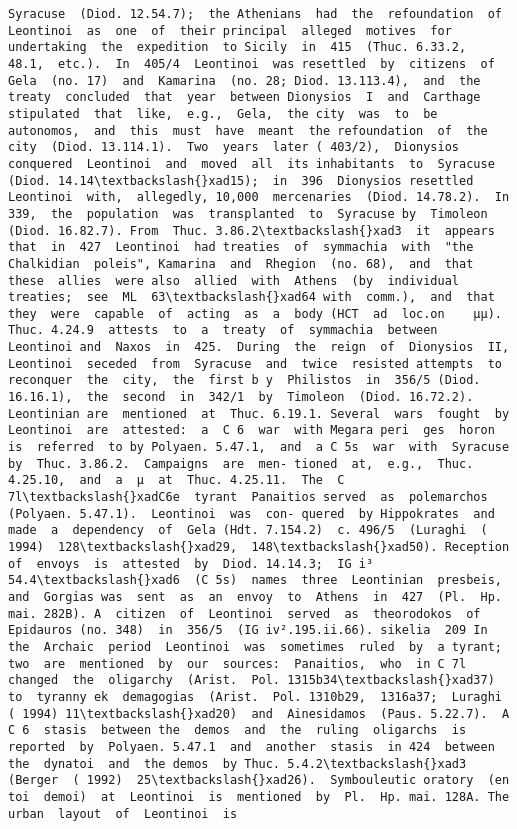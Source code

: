 \documentclass[11pt]{article}
\begin{document}
\begin{Verbatim}[commandchars=\\\{\}]
Syracuse  (Diod. 12.54.7);  the Athenians  had  the  refoundation  of  Leontinoi  as  one  of  their principal  alleged  motives  for  undertaking  the  expedition  to Sicily  in  415  (Thuc. 6.33.2,  48.1,  etc.).  In  405/4  Leontinoi  was resettled  by  citizens  of  Gela  (no. 17)  and  Kamarina  (no. 28; Diod. 13.113.4),  and  the  treaty  concluded  that  year  between Dionysios  I  and  Carthage  stipulated  that  like,  e.g.,  Gela,  the city  was  to  be  autonomos,  and  this  must  have  meant  the refoundation  of  the  city  (Diod. 13.114.1).  Two  years  later ( 403/2),  Dionysios  conquered  Leontinoi  and  moved  all  its inhabitants  to  Syracuse  (Diod. 14.14\textbackslash{}xad15);  in  396  Dionysios resettled  Leontinoi  with,  allegedly, 10,000  mercenaries  (Diod. 14.78.2).  In  339,  the  population  was  transplanted  to  Syracuse by  Timoleon  (Diod. 16.82.7). From  Thuc. 3.86.2\textbackslash{}xad3  it  appears  that  in  427  Leontinoi  had treaties  of  symmachia  with  "the  Chalkidian  poleis", Kamarina  and  Rhegion  (no. 68),  and  that  these  allies  were also  allied  with  Athens  (by  individual  treaties;  see  ML  63\textbackslash{}xad64 with  comm.),  and  that  they  were  capable  of  acting  as  a  body (HCT  ad  loc.on    µµ).  Thuc. 4.24.9  attests  to  a  treaty  of  symmachia  between  Leontinoi and  Naxos  in  425.  During  the  reign  of  Dionysios  II, Leontinoi  seceded  from  Syracuse  and  twice  resisted attempts  to  reconquer  the  city,  the  first b y  Philistos  in  356/5 (Diod. 16.16.1),  the  second  in  342/1  by  Timoleon  (Diod. 16.72.2). Leontinian are  mentioned  at  Thuc. 6.19.1. Several  wars  fought  by  Leontinoi  are  attested:  a  C 6  war  with Megara peri  ges  horon  is  referred  to by Polyaen. 5.47.1,  and  a C 5s  war  with  Syracuse  by  Thuc. 3.86.2.  Campaigns  are  men- tioned  at,  e.g.,  Thuc. 4.25.10,  and  a  µ  at  Thuc. 4.25.11.  The  C 7l\textbackslash{}xadC6e  tyrant  Panaitios served  as  polemarchos  (Polyaen. 5.47.1).  Leontinoi  was  con- quered  by Hippokrates  and  made  a  dependency  of  Gela (Hdt. 7.154.2)  c. 496/5  (Luraghi  ( 1994)  128\textbackslash{}xad29,  148\textbackslash{}xad50). Reception  of  envoys  is  attested  by  Diod. 14.14.3;  IG i³ 54.4\textbackslash{}xad6  (C 5s)  names  three  Leontinian  presbeis,  and  Gorgias was  sent  as  an  envoy  to  Athens  in  427  (Pl.  Hp.  mai. 282B). A  citizen  of  Leontinoi  served  as  theorodokos  of  Epidauros (no. 348)  in  356/5  (IG iv².195.ii.66). sikelia  209 In  the  Archaic  period  Leontinoi  was  sometimes  ruled  by  a tyrant;  two  are  mentioned  by  our  sources:  Panaitios,  who  in C 7l  changed  the  oligarchy  (Arist.  Pol. 1315b34\textbackslash{}xad37)  to  tyranny ek  demagogias  (Arist.  Pol. 1310b29,  1316a37;  Luraghi  ( 1994) 11\textbackslash{}xad20)  and  Ainesidamos  (Paus. 5.22.7).  A  C 6  stasis  between the  demos  and  the  ruling  oligarchs  is  reported  by  Polyaen. 5.47.1  and  another  stasis  in 424  between  the  dynatoi  and  the demos  by Thuc. 5.4.2\textbackslash{}xad3  (Berger  ( 1992)  25\textbackslash{}xad26).  Symbouleutic oratory  (en  toi  demoi)  at  Leontinoi  is  mentioned  by  Pl.  Hp. mai. 128A. The  urban  layout  of  Leontinoi  is  
\end{Verbatim}
\end{document}
